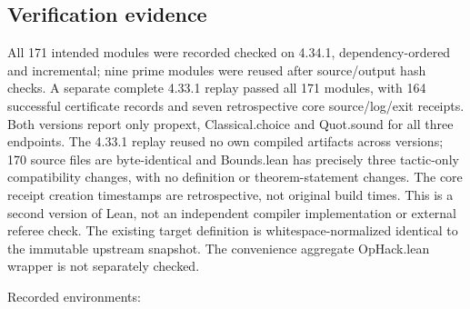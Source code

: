 \documentclass[11pt,a4paper]{article}
\begin{document}
\subsection{Verification evidence}
All 171 intended modules were recorded checked on 4.34.1, dependency-ordered and incremental; nine prime modules were reused after source/output hash checks. A separate complete 4.33.1 replay passed all 171 modules, with 164 successful certificate records and seven retrospective core source/log/exit receipts. Both versions report only propext, Classical.choice and Quot.sound for all three endpoints. The 4.33.1 replay reused no own compiled artifacts across versions; 170 source files are byte-identical and Bounds.lean has precisely three tactic-only compatibility changes, with no definition or theorem-statement changes. The core receipt creation timestamps are retrospective, not original build times. This is a second version of Lean, not an independent compiler implementation or external referee check. The existing target definition is whitespace-normalized identical to the immutable upstream snapshot. The convenience aggregate OpHack.lean wrapper is not separately checked.

Recorded environments:
\end{document}
